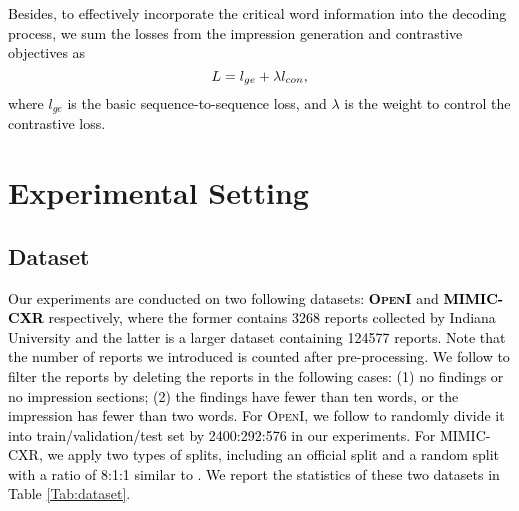 \documentclass[11pt]{article}
\begin{document}
\textcolor{black}{
Besides, to effectively incorporate the critical word information into the decoding process, we sum the losses from the impression generation and contrastive objectives as
%
\begin{equation}
\setlength\abovedisplayskip{5pt}
\setlength\belowdisplayskip{5pt}
    L = l_{ge}+ \lambda l_{con},
\end{equation}
%
where $l_{ge}$ is the basic sequence-to-sequence loss, and $\lambda$ is the weight to control the contrastive loss.
%
}






\section{Experimental Setting}
\subsection{Dataset}
\textcolor{black}{
Our experiments are conducted on two following datasets: \textbf{\textsc{OpenI}} \cite{demner2016preparing} and \textbf{\textsc{MIMIC-CXR}} \cite{johnson2019mimic} respectively, where the former contains 3268 reports collected by Indiana University and the latter is a larger dataset containing 124577 reports.
%
Note that the number of reports we introduced is counted after pre-processing.
%
We follow \cite{hu2021word,zhang2018learning} to filter the reports by deleting the reports in the following cases: (1) no findings or no impression sections; (2) the findings have fewer than ten words, or the impression has fewer than two words.
%
For \textsc{OpenI}, we follow \cite{hu2021word} to randomly divide it into train/validation/test set by 2400:292:576 in our experiments.
%
For \textsc{MIMIC-CXR}, we apply two types of splits, including an official split and a random split with a ratio of 8:1:1 similar to \cite{attend}.
%
We report the statistics of these two datasets in Table \ref{Tab:dataset}.
}
%
%
%

\end{document}
